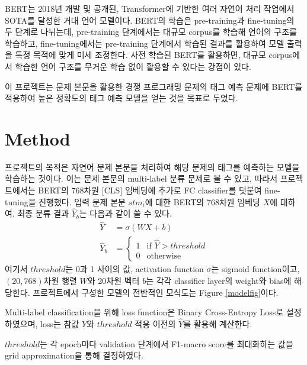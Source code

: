 \documentclass{article}
\begin{document}
BERT\cite{devlin2019bert}는 2018년 개발 및 공개된, Transformer에 기반한 여러 자연어 처리 작업에서 SOTA를 달성한 거대 언어 모델이다.
BERT의 학습은 pre-training과 fine-tuning의 두 단계로 나뉘는데, pre-training 단계에서는 대규모 corpus를 학습해 언어의 구조를 학습하고,
fine-tuning에서는 pre-training 단계에서 학습된 결과를 활용하여 모델 출력을 특정 목적에 맞게 미세 조정한다. 사전 학습된 BERT를 활용하면, 
대규모 corpus에서 학습한 언어 구조를 무거운 학습 없이 활용할 수 있다는 강점이 있다.

이 프로젝트는 문제 본문을 활용한 경쟁 프로그래밍 문제의 태그 예측 문제에 BERT를 적용하여 높은 정확도의 태그 예측 모델을 얻는 것을 목표로 두었다.
\section{Method}
 프로젝트의 목적은 자연어 문제 본문을 처리하여 해당 문제의 태그를 예측하는 모델을 학습하는 것이다.
이는 문제 본문의 multi-label 분류 문제로 볼 수 있고, 따라서 프로젝트에서는 
BERT의 768차원 [CLS] 임베딩에 추가로 FC classifier를 덧붙여 fine-tuning을 진행했다.
입력 문제 본문 $stm_i$에 대한 BERT의 768차원 임베딩 $X$에 대하여, 최종 분류 결과 $\hat{Y}_b$는 다음과 같이 쓸 수 있다.
\begin{align}
    \hat{Y} &= \sigma(WX + b)\\
    \hat{Y}_b &= \begin{cases}
        1 & \text{if } \hat{Y} > threshold\\
        0 & \text{otherwise}
    \end{cases}
\end{align}
여기서 $threshold$는 0과 1 사이의 값, activation function $\sigma$는 sigmoid function이고, $(20, 768)$차원 행렬 $W$와 20차원 벡터 $b$는 각각 classifier layer의 weight와 bias에 해당한다.
프로젝트에서 구성한 모델의 전반적인 모식도는 Figure \ref{modelfig}이다.

Multi-label classification을 위해 loss function은 Binary Cross-Entropy Loss로 설정하였으며\cite{Liu2017LearningEB}, 
loss는 참값 $Y$와 $threshold$ 적용 이전의 $\hat{Y}$를 활용해 계산한다.

$threshold$는 각 epoch마다 validation 단계에서 F1-macro score를 최대화하는 값을 grid approximation을 통해 결정하였다.
\end{document}
